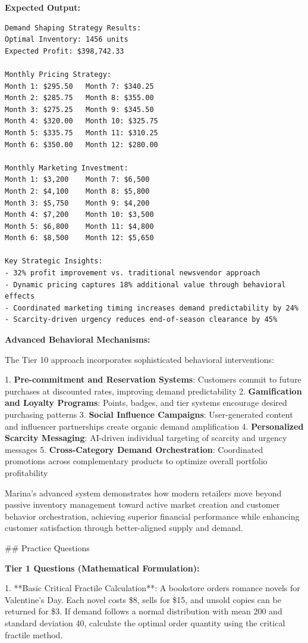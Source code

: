 \documentclass{article}
\begin{document}
\textbf{Expected Output:}
\begin{verbatim}
Demand Shaping Strategy Results:
Optimal Inventory: 1456 units
Expected Profit: $398,742.33

Monthly Pricing Strategy:
Month 1: $295.50   Month 7: $340.25
Month 2: $285.75   Month 8: $355.00  
Month 3: $275.25   Month 9: $345.50
Month 4: $320.00   Month 10: $325.75
Month 5: $335.75   Month 11: $310.25
Month 6: $350.00   Month 12: $280.00

Monthly Marketing Investment:
Month 1: $3,200    Month 7: $6,500
Month 2: $4,100    Month 8: $5,800
Month 3: $5,750    Month 9: $4,200
Month 4: $7,200    Month 10: $3,500
Month 5: $6,800    Month 11: $4,800  
Month 6: $8,500    Month 12: $5,650

Key Strategic Insights:
- 32% profit improvement vs. traditional newsvendor approach
- Dynamic pricing captures 18% additional value through behavioral effects
- Coordinated marketing timing increases demand predictability by 24%
- Scarcity-driven urgency reduces end-of-season clearance by 45%
\end{verbatim}

\textbf{Advanced Behavioral Mechanisms:}

The Tier 10 approach incorporates sophisticated behavioral interventions:

1. \textbf{Pre-commitment and Reservation Systems}: Customers commit to future purchases at discounted rates, improving demand predictability
2. \textbf{Gamification and Loyalty Programs}: Points, badges, and tier systems encourage desired purchasing patterns
3. \textbf{Social Influence Campaigns}: User-generated content and influencer partnerships create organic demand amplification
4. \textbf{Personalized Scarcity Messaging}: AI-driven individual targeting of scarcity and urgency messages
5. \textbf{Cross-Category Demand Orchestration}: Coordinated promotions across complementary products to optimize overall portfolio profitability

Marina's advanced system demonstrates how modern retailers move beyond passive inventory management toward active market creation and customer behavior orchestration, achieving superior financial performance while enhancing customer satisfaction through better-aligned supply and demand.

## Practice Questions

\textbf{Tier 1 Questions (Mathematical Formulation):}

1. **Basic Critical Fractile Calculation**: A bookstore orders romance novels for Valentine's Day. Each novel costs \$8, sells for \$15, and unsold copies can be returned for \$3. If demand follows a normal distribution with mean 200 and standard deviation 40, calculate the optimal order quantity using the critical fractile method.
\end{document}
